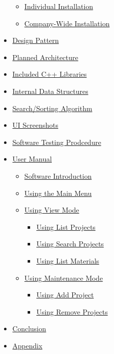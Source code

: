 \documentclass[
  english,
  a4paper,
,tablecaptionabove
]{scrartcl}
\providecommand{\tightlist}{%
  \setlength{\itemsep}{0pt}\setlength{\parskip}{0pt}}
\begin{document}
\begin{itemize}
  \begin{itemize}
  \tightlist
  \item
    \protect\hyperlink{individual-installation}{Individual Installation}
  \item
    \protect\hyperlink{company-wide-installation}{Company-Wide
    Installation}
  \end{itemize}
\item
  \protect\hyperlink{design-pattern}{Design Pattern}
\item
  \protect\hyperlink{planned-architecture}{Planned Architecture}
\item
  \protect\hyperlink{included-c-libraries}{Included C++ Libraries}
\item
  \protect\hyperlink{internal-data-structures}{Internal Data Structures}
\item
  \protect\hyperlink{searchsorting-algorithm}{Search/Sorting Algorithm}
\item
  \protect\hyperlink{ui-screenshots}{UI Screenshots}
\item
  \protect\hyperlink{software-testing-prodcedure}{Software Testing
  Prodcedure}
\item
  \protect\hyperlink{user-manual}{User Manual}

  \begin{itemize}
  \tightlist
  \item
    \protect\hyperlink{software-introduction}{Software Introduction}
  \item
    \protect\hyperlink{using-the-main-menu}{Using the Main Menu}
  \item
    \protect\hyperlink{using-view-mode}{Using View Mode}

    \begin{itemize}
    \tightlist
    \item
      \protect\hyperlink{using-list-projects}{Using List Projects}
    \item
      \protect\hyperlink{using-search-projects}{Using Search Projects}
    \item
      \protect\hyperlink{using-list-materials}{Using List Materials}
    \end{itemize}
  \item
    \protect\hyperlink{using-maintenance-mode}{Using Maintenance Mode}

    \begin{itemize}
    \tightlist
    \item
      \protect\hyperlink{using-add-project}{Using Add Project}
    \item
      \protect\hyperlink{using-remove-projects}{Using Remove Projects}
    \end{itemize}
  \end{itemize}
\item
  \protect\hyperlink{conclusion}{Conclusion}
\item
  \protect\hyperlink{appendix}{Appendix}


\end{itemize}
\end{document}
